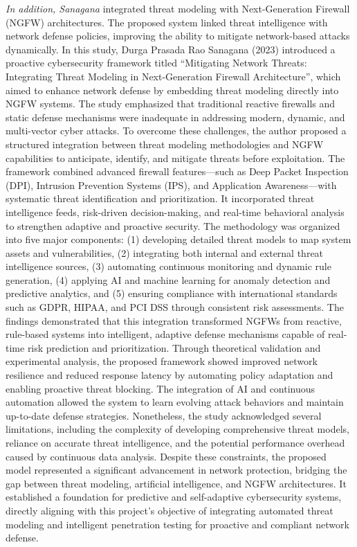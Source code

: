 \textit{In addition, Sanagana} integrated threat modeling with Next-Generation Firewall (NGFW) architectures. The proposed system linked threat intelligence with network defense policies, improving the ability to mitigate network-based attacks dynamically. In this study, Durga Prasada Rao Sanagana (2023) introduced a proactive cybersecurity framework titled ``Mitigating Network Threats: Integrating Threat Modeling in Next-Generation Firewall Architecture'', which aimed to enhance network defense by embedding threat modeling directly into NGFW systems. The study emphasized that traditional reactive firewalls and static defense mechanisms were inadequate in addressing modern, dynamic, and multi-vector cyber attacks. To overcome these challenges, the author proposed a structured integration between threat modeling methodologies and NGFW capabilities to anticipate, identify, and mitigate threats before exploitation. The framework combined advanced firewall features—such as Deep Packet Inspection (DPI), Intrusion Prevention Systems (IPS), and Application Awareness—with systematic threat identification and prioritization. It incorporated threat intelligence feeds, risk-driven decision-making, and real-time behavioral analysis to strengthen adaptive and proactive security. The methodology was organized into five major components: (1) developing detailed threat models to map system assets and vulnerabilities, (2) integrating both internal and external threat intelligence sources, (3) automating continuous monitoring and dynamic rule generation, (4) applying AI and machine learning for anomaly detection and predictive analytics, and (5) ensuring compliance with international standards such as GDPR, HIPAA, and PCI DSS through consistent risk assessments. The findings demonstrated that this integration transformed NGFWs from reactive, rule-based systems into intelligent, adaptive defense mechanisms capable of real-time risk prediction and prioritization. Through theoretical validation and experimental analysis, the proposed framework showed improved network resilience and reduced response latency by automating policy adaptation and enabling proactive threat blocking. The integration of AI and continuous automation allowed the system to learn evolving attack behaviors and maintain up-to-date defense strategies. Nonetheless, the study acknowledged several limitations, including the complexity of developing comprehensive threat models, reliance on accurate threat intelligence, and the potential performance overhead caused by continuous data analysis. Despite these constraints, the proposed model represented a significant advancement in network protection, bridging the gap between threat modeling, artificial intelligence, and NGFW architectures. It established a foundation for predictive and self-adaptive cybersecurity systems, directly aligning with this project's objective of integrating automated threat modeling and intelligent penetration testing for proactive and compliant network defense. \cite{sanagana2023}

